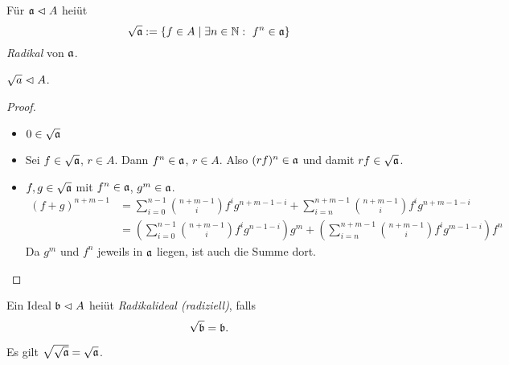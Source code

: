 \begin{definition}[Radikal]
	Für $\mathfrak{a} \vartriangleleft A$ heiüt
	\[
		\sqrt \a := \{ f\in A \mid \exists n \in \N:\ f^n\in \a\}
	\]
	\emph{Radikal} von $\mathfrak{a}$.
\end{definition}

\begin{lemma}
	\label{lemma:radikal ist ideal}
	$\sqrt a \vartriangleleft A$.
\end{lemma}
\begin{proof}
	\begin{itemize}
	  \item $0\in \sqrt{\mathfrak{a}}$ \checkmark
	  \item Sei $f \in \sqrt {\mathfrak{a}}$, $r\in A$. Dann
	  	$f^n \in \mathfrak{a}$, $r\in A$. Also 
	  	$(rf)^n \in \mathfrak{a}$ und damit $rf\in \sqrt{\mathfrak{a}}$.
	  \item $f,g\in \sqrt{\mathfrak{a}}$ mit $f^n \in \mathfrak{a}$, $g^m \in \mathfrak{a}$.
	  	\begin{align*}
	  		(f+g)^{n+m-1} &= \sum_{i=0}^{n-1} \binom{n+m-1}{i} f^i g^{n+m-1-i}
	  			+ \sum_{i=n}^{n+m-1} \binom{n+m-1}{i}
	  				f^i g^{n+m-1-i}\\
  				&= \left( \sum_{i=0}^{n-1} \binom{n+m-1}{i} 
  					f^i g^{n-1-i}\right) g^m
  					+  \left(\sum_{i=n}^{n+m-1} \binom{n+m-1}{i}
  						f^i g^{m-1-i}\right) f^n
	  	\end{align*}
	  	Da $g^m$ und $f^n$ jeweils in $\mathfrak{a}$ liegen, ist auch die Summe dort.
	\end{itemize}
\end{proof} 

\begin{definition}
	Ein Ideal $\mathfrak b \vartriangleleft A$ heiüt \emph{Radikalideal (radiziell)},
	falls
	\[\sqrt \fr b = \fr b.\]
\end{definition}

\begin{bemerkung}
	Es gilt $\sqrt{\sqrt {\mathfrak{a}}} = \sqrt{\mathfrak{a}}$.
\end{bemerkung}

